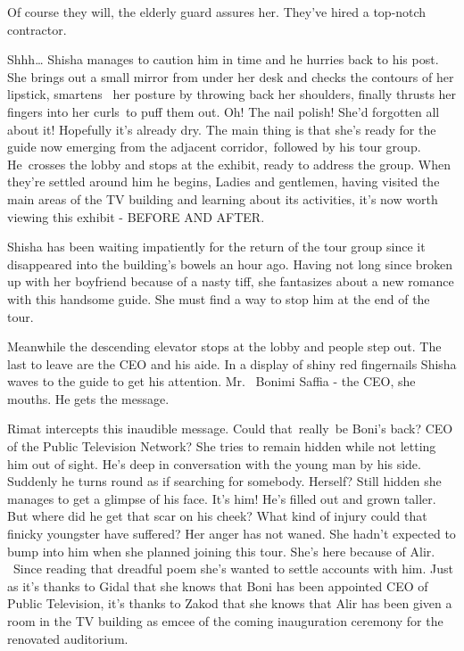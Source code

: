 \documentclass[12pt]{book}
\begin{document}
{\textquotedbl}Of course they will,{\textquotedbl} the elderly guard assures her. {\textquotedbl}They've hired a
top-notch contractor.{\textquotedbl}

{\textquotedbl}Shhh{\dots}{\textquotedbl} Shisha manages to caution him in time and he hurries back to his post. She
brings out a small mirror from under her desk and checks the contours of her lipstick, smartens {\ }her
posture by{ }throwing back her shoulders, finally thrusts her fingers into her curls~to puff them out.
Oh! The nail polish! She'd forgotten all about it! Hopefully it's already dry. The main thing is that she's ready for
the guide now emerging from the adjacent corridor,~followed by his tour group. He~crosses the lobby and stops at the
exhibit, ready to address the group. When they're settled around him he begins, {\textquotedbl}Ladies and gentlemen,
having visited the main areas of the TV building and learning about its activities, it's now worth viewing this exhibit
- BEFORE AND AFTER.{\textquotedbl}

Shisha has been waiting impatiently for the return of the tour group since it disappeared into the building's bowels an
hour ago. Having not long since broken up with her boyfriend because of a nasty tiff, she fantasizes about a new
romance with this handsome guide. She must find a way to stop him at the end of the tour.

Meanwhile the descending elevator stops at the lobby and people step out. The last to leave are the CEO and his aide. In
a display of shiny red fingernails Shisha waves to the guide to get his attention. {\textquotedbl}Mr. ~Bonimi Saffia -
the CEO,{\textquotedbl} she mouths. He gets the message.

Rimat intercepts this inaudible message. Could that~really~be Boni's back? CEO of the Public Television Network? She
tries to remain hidden while not letting him out of sight. He's deep in conversation with the young man by his side.
Suddenly he turns round as if searching for somebody. Herself? Still hidden she manages to get a glimpse of his face.
It's him! He's filled out and grown taller. But where did he get that scar on his cheek? What kind of injury could that
finicky youngster have suffered? Her anger has not waned. She hadn't expected to bump into him when she planned joining
this tour{.} She's here because of Alir. \ Since reading that dreadful
poem she's wanted to settle accounts with him. Just as it's thanks to Gidal that she knows that Boni has been appointed
CEO of Public Television, it's thanks to Zakod that she knows that Alir has been given a room in the TV building as
emcee of the{
}coming{ }inauguration ceremony for the renovated auditorium.
\end{document}
